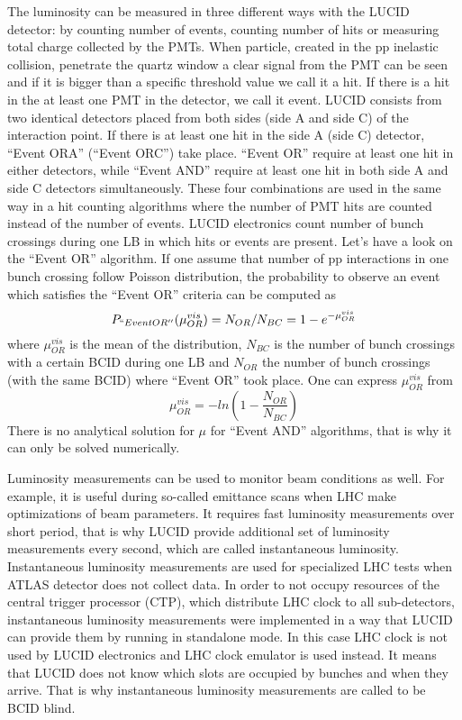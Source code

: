 The luminosity can be measured in three different ways with the LUCID detector: by counting number of events, counting number of hits or measuring total charge collected by the PMTs. When particle, created in the pp inelastic collision, penetrate the quartz window a clear signal from the PMT can be seen and if it is bigger than a specific threshold value we call it a hit. If there is a hit in the at least one PMT in the detector, we call it event. LUCID consists from two identical detectors placed from both sides (side A and side C) of the interaction point. 
If there is at least one hit in the side A (side C) detector, ``Event ORA'' (``Event ORC'') take place. ``Event OR'' require at least one hit in either detectors, while ``Event AND'' require at least one hit in both side A and side C detectors simultaneously. These four combinations are used in the same way in a hit counting algorithms where the number of PMT hits are counted instead of the number of events.
LUCID electronics count number of bunch crossings during one LB in which hits or events are present.
Let’s have a look on the ``Event OR'' algorithm. If one assume that number of pp interactions in one bunch crossing follow Poisson distribution, the probability to observe an event which satisfies the ``Event OR'' criteria can be computed as
\begin{equation}
P_{``Event OR''} (\mu_{OR}^{vis}) = N_{OR} / N_{BC} = 1 - e^{-\mu_{OR}^{vis}}
\label{eq:poissonProb}
\end{equation}
where $\mu_{OR}^{vis}$ is the mean of the distribution, $N_{BC}$ is the number of bunch crossings with a certain BCID during one LB and $N_{OR}$ the number of bunch crossings 
(with the same BCID) where ``Event OR'' took place. One can express $\mu_{OR}^{vis}$ from 
\begin{equation}
\mu_{OR}^{vis} = -ln( 1 - \dfrac{N_{OR}}{N_{BC}})
\label{eq:logFormula}
\end{equation}
There is no analytical solution for $\mu$ for ``Event AND'' algorithms, that is why it can only be solved numerically. 

Luminosity measurements can be used to monitor beam conditions as well.
For example, it is useful during so-called emittance scans when LHC make optimizations of beam parameters.
It requires fast luminosity measurements over short period, that is why LUCID provide additional set of luminosity measurements every second, which are called instantaneous luminosity.
Instantaneous luminosity measurements are used for specialized LHC tests when ATLAS detector does not collect data. In order to not occupy resources of the central trigger processor (CTP), which distribute LHC clock to all sub-detectors, instantaneous luminosity measurements were implemented in a way that LUCID can provide them by running in standalone mode.
In this case LHC clock is not used by LUCID electronics and LHC clock emulator is used instead.
It means that LUCID does not know which slots are occupied by bunches and when they arrive.
That is why instantaneous luminosity measurements are called to be BCID blind.

